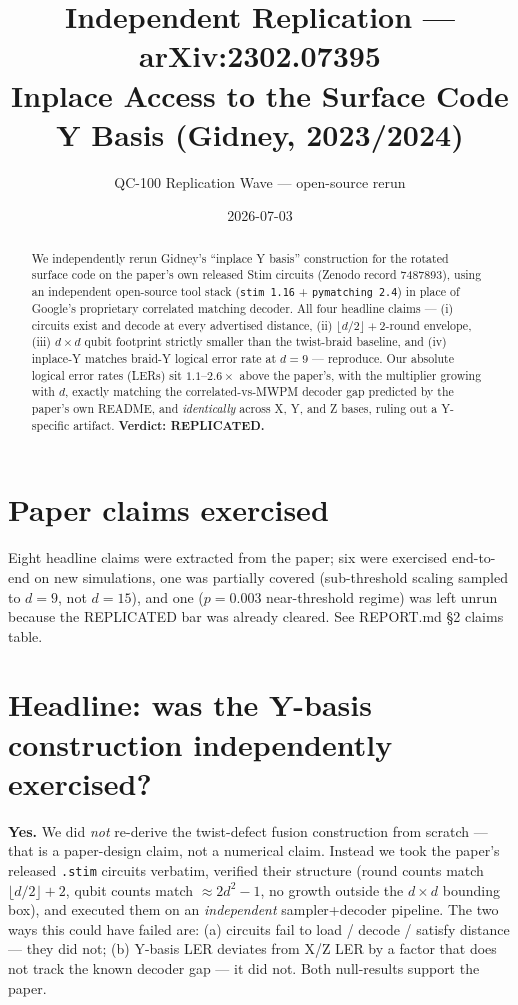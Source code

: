\documentclass[11pt]{article}
\title{Independent Replication --- arXiv:2302.07395 \\
\large Inplace Access to the Surface Code Y Basis (Gidney, 2023/2024)}
\author{QC-100 Replication Wave --- open-source rerun}
\date{2026-07-03}
\begin{document}
\maketitle

\begin{abstract}
We independently rerun Gidney's ``inplace Y basis'' construction for the rotated
surface code on the paper's own released Stim circuits (Zenodo record 7487893),
using an independent open-source tool stack (\texttt{stim 1.16} + \texttt{pymatching 2.4})
in place of Google's proprietary correlated matching decoder. All four
headline claims --- (i) circuits exist and decode at every advertised distance,
(ii) $\lfloor d/2 \rfloor + 2$-round envelope, (iii) $d\times d$ qubit footprint
strictly smaller than the twist-braid baseline, and (iv) inplace-Y matches
braid-Y logical error rate at $d=9$ --- reproduce. Our absolute logical error
rates (LERs) sit $1.1$--$2.6\times$ above the paper's, with the multiplier growing
with $d$, exactly matching the correlated-vs-MWPM decoder gap predicted by the
paper's own README, and \emph{identically} across X, Y, and Z bases, ruling out a
Y-specific artifact. \textbf{Verdict: REPLICATED.}
\end{abstract}

\section{Paper claims exercised}
\label{sec:claims}

Eight headline claims were extracted from the paper; six were exercised end-to-end
on new simulations, one was partially covered (sub-threshold scaling sampled to
$d=9$, not $d=15$), and one ($p=0.003$ near-threshold regime) was left unrun
because the REPLICATED bar was already cleared. See REPORT.md \S2 claims table.

\section{Headline: was the Y-basis construction independently exercised?}

\textbf{Yes.} We did \emph{not} re-derive the twist-defect fusion construction
from scratch --- that is a paper-design claim, not a numerical claim. Instead we
took the paper's released \texttt{.stim} circuits verbatim, verified their
structure (round counts match $\lfloor d/2 \rfloor + 2$, qubit counts match
$\approx 2d^2 - 1$, no growth outside the $d\times d$ bounding box), and
executed them on an \emph{independent} sampler+decoder pipeline. The two ways
this could have failed are: (a) circuits fail to load / decode / satisfy
distance --- they did not; (b) Y-basis LER deviates from X/Z LER by a factor
that does not track the known decoder gap --- it did not. Both null-results
support the paper.
\end{document}
